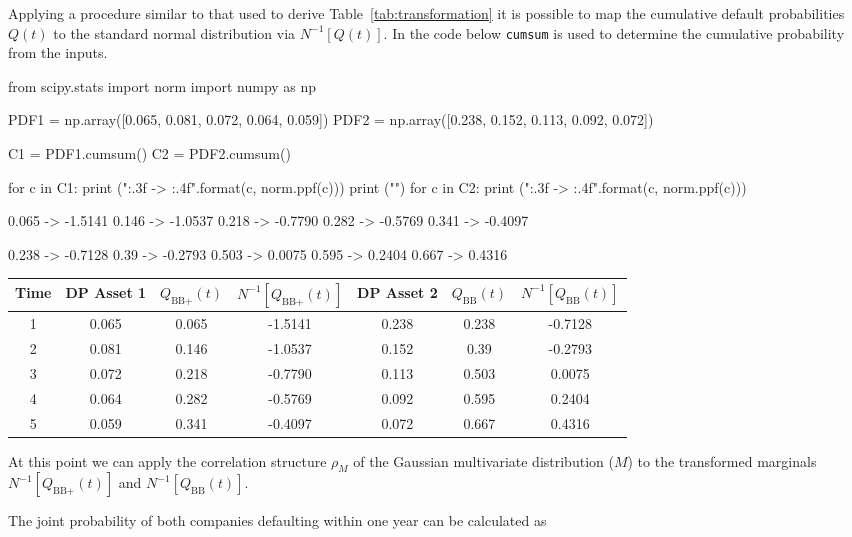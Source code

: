 Applying a procedure similar to that used to derive Table~\ref{tab:transformation} it is possible to map the cumulative default probabilities $Q(t)$ to the standard normal distribution via $N^{-1}[Q(t)]$.
In the code below \texttt{cumsum} is used to determine the cumulative probability from the inputs.

\begin{ipython}
from scipy.stats import norm
import numpy as np

PDF1 = np.array([0.065, 0.081, 0.072, 0.064, 0.059])
PDF2 = np.array([0.238, 0.152, 0.113, 0.092, 0.072])

C1 = PDF1.cumsum()
C2 = PDF2.cumsum()

for c in C1:
    print ("{:.3f} -> {:.4f}".format(c, norm.ppf(c)))
print ("")
for c in C2:
    print ("{:.3f} -> {:.4f}".format(c, norm.ppf(c)))
\end{ipython}
\begin{ioutput}
0.065 -> -1.5141
0.146 -> -1.0537
0.218 -> -0.7790
0.282 -> -0.5769
0.341 -> -0.4097

0.238 -> -0.7128
0.39 -> -0.2793
0.503 -> 0.0075
0.595 -> 0.2404
0.667 -> 0.4316
\end{ioutput}

\begin{table}[htbp]
\centering
\begin{tabular}{|c|c|c|c|c|c|c|}
\hline
Time & DP Asset 1 & $Q_{\textrm{BB+}}(t)$ & $N^{-1}[Q_{\textrm{BB+}}(t)]$ & DP Asset 2 & $Q_{\textrm{BB}}(t)$ & $N^{-1}[Q_{\textrm{BB}}(t)]$\\
\hline
\hline
1 & 0.065 & 0.065 & -1.5141 & 0.238 & 0.238 & -0.7128\\
2 & 0.081 & 0.146 & -1.0537 & 0.152 & 0.39 & -0.2793\\
3 & 0.072 & 0.218 & -0.7790 & 0.113 & 0.503 & 0.0075\\
4 & 0.064 & 0.282 & -0.5769 & 0.092 & 0.595 & 0.2404\\
5 & 0.059 & 0.341 & -0.4097 & 0.072 & 0.667 & 0.4316\\
\hline
\end{tabular}
\end{table}

At this point we can apply the correlation structure $\rho_M$ of the Gaussian multivariate distribution ($M$) to the transformed marginals $N^{-1}[Q_{\textrm{BB+}}(t)]$ and $N^{-1}[Q_{\textrm{BB}}(t)]$.

The joint probability of both companies defaulting within one year can be calculated as

